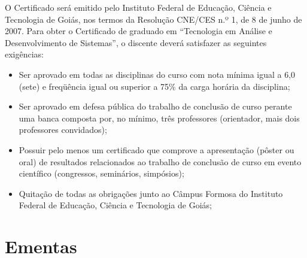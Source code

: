 \documentclass[11pt,fleqn]{book} %
\begin{document}
O Certificado será emitido pelo Instituto Federal de Educação, Ciência e Tecnologia de Goiás, nos termos da Resolução CNE/CES n.º 1, de 8 de junho de 2007.	
Para obter o Certificado de graduado em ``Tecnologia em Análise e Desenvolvimento de Sistemas'', o discente deverá satisfazer as seguintes exigências:
\begin{itemize}
	\item Ser aprovado em todas as disciplinas do curso com nota mínima igual a 6,0 (sete) e freqüência igual ou superior a 75\% da carga horária da disciplina;
	\item Ser aprovado em defesa pública do trabalho de conclusão de curso perante uma banca composta por, no mínimo, três professores (orientador, mais dois professores convidados);
	\item Possuir pelo menos um certificado que comprove a apresentação (pôster ou oral) de resultados relacionados ao trabalho de conclusão de curso em evento científico (congressos, seminários, simpósios);
	\item Quitação de todas as obrigações junto ao Câmpus Formosa do Instituto Federal de Educação, Ciência e Tecnologia de Goiás;
\end{itemize}

\chapter{Ementas}
\vspace{12em}


\newpage
\end{document}
